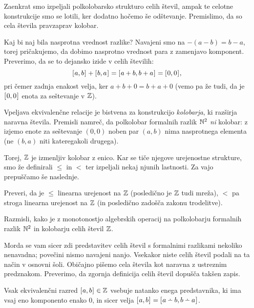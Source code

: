 Zaenkrat smo izpeljali polkolobarsko strukturo celih števil, ampak te celotne konstrukcije smo se lotili, ker dodatno hočemo še odštevanje. Premislimo, da so cela števila pravzaprav kolobar.

Kaj bi naj bila nasprotna vrednost razlike? Navajeni smo na $-(a - b) = b - a$, torej pričakujemo, da dobimo nasprotno vrednost para z zamenjavo komponent. Preverimo, da se to dejansko izide v celih številih:
\[\ec{a, b} + \ec{b, a} = \ec{a + b, b + a} = \ec{0, 0},\]
pri čemer zadnja enakost velja, ker $a + b + 0 = b + a + 0$ (vemo pa že tudi, da je $[\:\!{0, 0}\:\!]_{}$ enota za seštevanje v $\mathbb{Z}$).

\begin{naloga}
Vpeljava ekvivalenčne relacije je bistvena za konstrukcijo \emph{kolobarja}, ki razširja naravna števila. Premisli namreč, da polkolobar formalnih razlik $\mathbb{N}^2$ \emph{ni} kolobar: z izjemo enote za seštevanje $(0, 0)$ noben par $(a, b)$ nima nasprotnega elementa (ne $(b, a)$ niti kateregakoli drugega).
\end{naloga}

Torej, $\mathbb{Z}$ je izmenljiv kolobar z enico. Kar se tiče njegove urejenostne strukture, smo že definirali $\leq$ in $<$ ter izpeljali nekaj njunih lastnosti. Za vajo prepuščamo še naslednje.
%
\begin{naloga}
Preveri, da je $\leq$ linearna urejenost na $\mathbb{Z}$ (posledično je $\mathbb{Z}$ tudi mreža), $<$ pa stroga linearna urejenost na $\mathbb{Z}$ (in posledično zadošča zakonu trodelitve).
\end{naloga}

\begin{naloga}
Razmisli, kako je z monotonostjo algebrskih operacij na polkolobarju formalnih razlik $\mathbb{N}^2$ in kolobarju celih števil $\mathbb{Z}$.
\end{naloga}

Morda se vam sicer zdi predstavitev celih števil s formalnimi razlikami nekoliko nenavadna; povečini nismo navajeni nanjo. Vsekakor niste celih števil podali na ta način v osnovni šoli. Običajno pišemo cela števila kot naravna z ustreznim predznakom. Preverimo, da zgornja definicija celih števil dopušča takšen zapis.

\begin{trditev}
Vsak ekvivalenčni razred $[\:\!{a, b}\:\!]_{} \in \mathbb{Z}$ vsebuje natanko enega predstavnika, ki ima vsaj eno komponento enako $0$, in sicer velja $\ec{a, b} = \ec{a \monus b, b \monus a}$.
\end{trditev}

